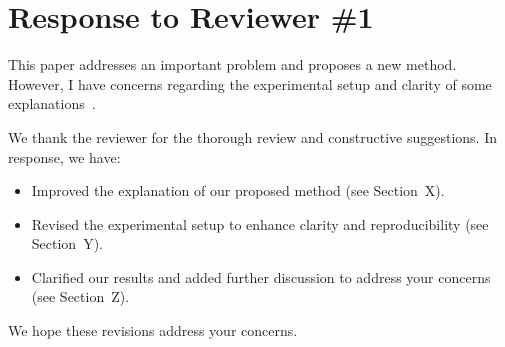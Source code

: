 \section*{Response to Reviewer \#1}
\setcounter{commentcounter}{0}

\begin{generalcomment}
This paper addresses an important problem and proposes a new method. However, I have concerns regarding the experimental setup and clarity of some explanations~\cite{smith2023}.
\end{generalcomment}

\begin{generalresponse}
We thank the reviewer for the thorough review and constructive suggestions. In response, we have:
\begin{itemize}
    \item Improved the explanation of our proposed method (see Section~X).
    \item Revised the experimental setup to enhance clarity and reproducibility (see Section~Y).
    \item Clarified our results and added further discussion to address your concerns (see Section~Z).
\end{itemize}
We hope these revisions address your concerns.
\end{generalresponse}



